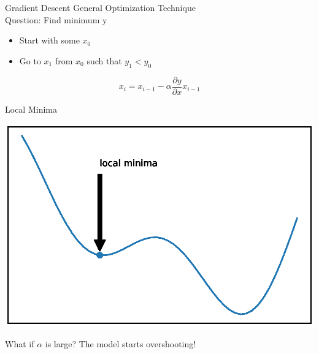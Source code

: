 \documentclass{beamer}
\begin{document}
	\begin{frame}{Gradient Descent}
		General Optimization Technique\\
		Question: Find minimum y
		\begin{itemize}
			\item Start with some $x_{0}$
			\item Go to $x_{1}$ from $x_{0} $ such that $y_{1}< y_{0}$
		\end{itemize}
		
		\begin{equation*}
		x_{i} = x_{i-1} - \alpha\frac{\partial y }{\partial x} x_{i-1}
		\end{equation*}
		
	\end{frame}
	
	\begin{frame}{Local Minima}
		\begin{center}
			\includegraphics[totalheight=6cm]{gradient-descent/local-minima.eps}
		\end{center}
	\end{frame}
	
	
	
	
	\begin{frame}{What if $\alpha$ is large?}
		The model starts overshooting!
	\end{frame}
	
\end{document}
